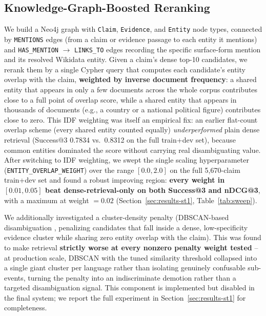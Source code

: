 \documentclass[
]{ceurart}
\begin{document}
\subsection{Knowledge-Graph-Boosted Reranking}
\label{sec:st1-kg}

We build a Neo4j graph with \texttt{Claim}, \texttt{Evidence}, and
\texttt{Entity} node types, connected by \texttt{MENTIONS} edges (from a
claim or evidence passage to each entity it mentions) and
\texttt{HAS\_MENTION} $\rightarrow$ \texttt{LINKS\_TO} edges recording
the specific surface-form mention and its resolved Wikidata entity.
Given a claim's dense top-10 candidates, we rerank them by a single
Cypher query that computes each candidate's entity overlap with the
claim, \textbf{weighted by inverse document frequency}: a shared entity
that appears in only a few documents across the whole corpus contributes
close to a full point of overlap score, while a shared entity that
appears in thousands of documents (e.g., a country or a national
political figure) contributes close to zero. This IDF weighting was
itself an empirical fix: an earlier flat-count overlap scheme (every
shared entity counted equally) \emph{underperformed} plain dense
retrieval (Success@3 0.7834 vs.\ 0.8312 on the full train+dev set),
because common entities dominated the score without carrying real
disambiguating value. After switching to IDF weighting, we swept the
single scaling hyperparameter (\texttt{ENTITY\_OVERLAP\_WEIGHT}) over
the range $[0.0, 2.0]$ on the full 5{,}670-claim train+dev set and found
a robust improving region: \textbf{every weight in $[0.01, 0.05]$ beat
dense-retrieval-only on both Success@3 and nDCG@3}, with a maximum at
weight $= 0.02$ (Section~\ref{sec:results-st1}, Table~\ref{tab:sweep}).

We additionally investigated a cluster-density penalty (DBSCAN-based
disambiguation \cite{ester1996dbscan}, penalizing candidates that fall
inside a dense, low-specificity evidence cluster while sharing zero
entity overlap with the claim). This was found to make retrieval
\textbf{strictly worse at every nonzero penalty weight tested} -- at
production scale, DBSCAN with the tuned similarity threshold collapsed
into a single giant cluster per language rather than isolating
genuinely confusable sub-events, turning the penalty into an
indiscriminate demotion rather than a targeted disambiguation signal.
This component is implemented but disabled in the final system; we
report the full experiment in Section~\ref{sec:results-st1} for
completeness.
\end{document}

